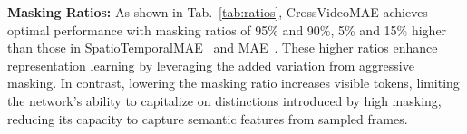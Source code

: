 \begin{table}[h!]
\vspace{-5pt}
\centering
\scriptsize
{}
\vspace{-5pt}
\captionsetup{font=footnotesize}
\caption{Performance comparison of various data augmentation techniques on the SSv2 dataset for RandomAugment (Aug), Random Erasing (Era), MixUp, and CutMix respectively.}
\label{tab:augment}
\vspace{-10pt}
\end{table}




\noindent\textbf{Masking Ratios:}
As shown in Tab.~\ref{tab:ratios}, CrossVideoMAE achieves optimal performance with masking ratios of 95\% and 90\%, 5\% and 15\% higher than those in SpatioTemporalMAE~\cite{feichtenhofer2022masked} and MAE~\cite{he2022masked}. These higher ratios enhance representation learning by leveraging the added variation from aggressive masking. In contrast, lowering the masking ratio increases visible tokens, limiting the network’s ability to capitalize on distinctions introduced by high masking, reducing its capacity to capture semantic features from sampled frames.


